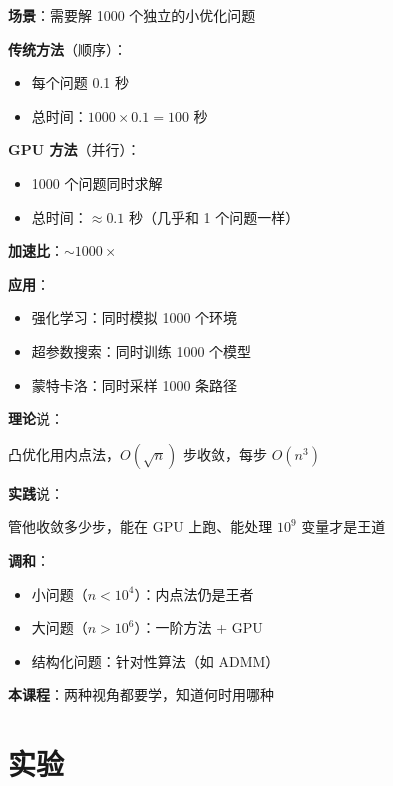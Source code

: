 \documentclass[12pt, a4paper]{ctexart}
\begin{document}
\begin{blackboard}

\textbf{场景}：需要解 1000 个独立的小优化问题

\textbf{传统方法}（顺序）：
\begin{itemize}
    \item 每个问题 0.1 秒
    \item 总时间：$1000 \times 0.1 = 100$ 秒
\end{itemize}

\textbf{GPU 方法}（并行）：
\begin{itemize}
    \item 1000 个问题同时求解
    \item 总时间：$\approx 0.1$ 秒（几乎和 1 个问题一样）
\end{itemize}

\textbf{加速比}：$\sim 1000\times$

\textbf{应用}：
\begin{itemize}
    \item 强化学习：同时模拟 1000 个环境
    \item 超参数搜索：同时训练 1000 个模型
    \item 蒙特卡洛：同时采样 1000 条路径
\end{itemize}

\end{blackboard}

\begin{insight}[理论 vs 实践的张力]

\textbf{理论}说：

凸优化用内点法，$O(\sqrt{n})$ 步收敛，每步 $O(n^3)$

\textbf{实践}说：

管他收敛多少步，能在 GPU 上跑、能处理 $10^9$ 变量才是王道

\textbf{调和}：

\begin{itemize}
    \item 小问题（$n < 10^4$）：内点法仍是王者
    \item 大问题（$n > 10^6$）：一阶方法 + GPU
    \item 结构化问题：针对性算法（如 ADMM）
\end{itemize}

\textbf{本课程}：两种视角都要学，知道何时用哪种

\end{insight}

\section{实验}
\end{document}

